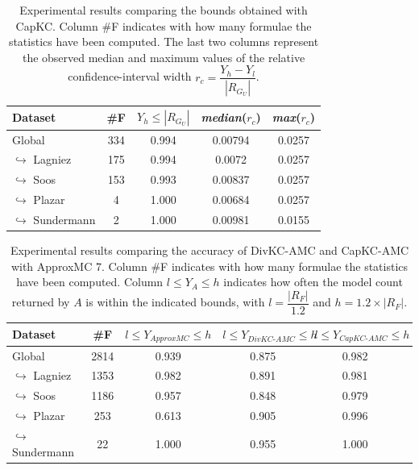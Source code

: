 \documentclass{article}
\newcommand\approxmc[0]{ApproxMC\xspace}
\newcommand\divkcamc[0]{DivKC-AMC\xspace}
\newcommand\capkc[0]{CapKC\xspace}
\newcommand\capkcamc[0]{CapKC-AMC\xspace}
\begin{document}
    
\begin{table}[h!]
        \centering
            \begin{tabular}{l|c|c|c|c}
                Dataset & \#F & $Y_h \leq |R_{G_U}|$ & \textit{median}($r_c$) & \textit{max}($r_c$) \\ 
                \hline 
Global & 334 & 0.994 & 0.00794 & 0.0257 \\
$\hookrightarrow$ Lagniez \cite{D4} & 175 & 0.994 & 0.0072 & 0.0257 \\
$\hookrightarrow$ Soos \cite{soos_2024_10449477} & 153 & 0.993 & 0.00837 & 0.0257 \\
$\hookrightarrow$ Plazar \cite{Plazar2019} & 4 & 1.000 & 0.00684 & 0.0257 \\
$\hookrightarrow$ Sundermann \cite{SBK+:SPLC24} & 2 & 1.000 & 0.00981 & 0.0155 \\
            \end{tabular}
        \caption{Experimental results comparing the bounds obtained with \capkc.
        Column \#F indicates with how many formulae the statistics have been computed.
        The last two columns represent the observed median and maximum values of the relative confidence-interval width $r_c = \dfrac{Y_h - Y_l}{|R_{G_U}|}$.
        }
        \label{capkc:tab:coverage}
    \end{table}

    
\begin{table}[h!]
        \centering
            \begin{tabular}{l|c|c|c|c|c}
                Dataset & \#F & $l \leq Y_{\textit{\approxmc}} \leq h$ & $l \leq Y_{\textit{\divkcamc}} \leq h$ & $l \leq Y_{\textit{\capkcamc}} \leq h$ \\ 
                \hline 
Global & 2814 & 0.939 & 0.875 & 0.982 \\
$\hookrightarrow$ Lagniez \cite{D4} & 1353 & 0.982 & 0.891 & 0.981 \\
$\hookrightarrow$ Soos \cite{soos_2024_10449477} & 1186 & 0.957 & 0.848 & 0.979 \\
$\hookrightarrow$ Plazar \cite{Plazar2019} & 253 & 0.613 & 0.905 & 0.996 \\
$\hookrightarrow$ Sundermann \cite{SBK+:SPLC24} & 22 & 1.000 & 0.955 & 1.000 \\
            \end{tabular}
                \caption{Experimental results comparing the accuracy of \divkcamc and \capkcamc with \approxmc7.
            Column \#F indicates with how many formulae the statistics have been computed.
            Column $l \leq Y_{A} \leq h$ indicates how often the model count returned by $A$ is within the indicated bounds, with $l = \dfrac{|R_F|}{1.2}$ and $h = 1.2 \times |R_F|$.
        }
        \label{divkc:tab:appmc:acc}
    \end{table}
\end{document}
